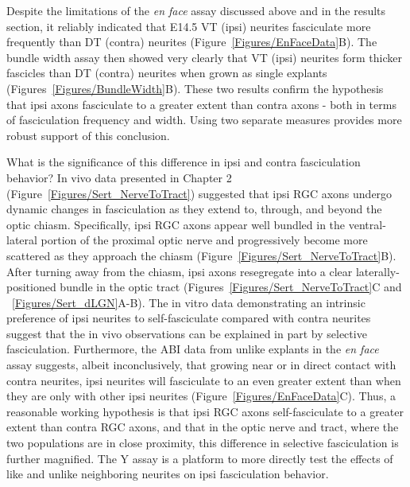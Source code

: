 Despite the limitations of the \emph{en face} assay discussed above and in the results section, it reliably indicated that E14.5 VT (ipsi) neurites fasciculate more frequently than DT (contra) neurites (Figure~\ref{Figures/EnFaceData}B).
The bundle width assay then showed very clearly that VT (ipsi) neurites form thicker fascicles than DT (contra) neurites when grown as single explants (Figures~\ref{Figures/BundleWidth}B).
These two results confirm the hypothesis that ipsi axons fasciculate to a greater extent than contra axons - both in terms of fasciculation frequency and width.
Using two separate measures provides more robust support of this conclusion.

What is the significance of this difference in ipsi and contra fasciculation behavior?
In vivo data presented in Chapter 2 (Figure~\ref{Figures/Sert_NerveToTract}) suggested that ipsi RGC axons undergo dynamic changes in fasciculation as they extend to, through, and beyond the optic chiasm.
Specifically, ipsi RGC axons appear well bundled in the ventral-lateral portion of the proximal optic nerve and progressively become more scattered as they approach the chiasm (Figure~\ref{Figures/Sert_NerveToTract}B).
After turning away from the chiasm, ipsi axons resegregate into a clear laterally-positioned bundle in the optic tract (Figures~\ref{Figures/Sert_NerveToTract}C and ~\ref{Figures/Sert_dLGN}A-B).
The in vitro data demonstrating an intrinsic preference of ipsi neurites to self-fasciculate compared with contra neurites suggest that the in vivo observations can be explained in part by selective fasciculation.
Furthermore, the ABI data from unlike explants in the \emph{en face} assay suggests, albeit inconclusively, that growing near or in direct contact with contra neurites, ipsi neurites will fasciculate to an even greater extent than when they are only with other ipsi neurites (Figure~\ref{Figures/EnFaceData}C).
Thus, a reasonable working hypothesis is that ipsi RGC axons self-fasciculate to a greater extent than contra RGC axons, and that in the optic nerve and tract, where the two populations are in close proximity, this difference in selective fasciculation is further magnified.
The Y assay is a platform to more directly test the effects of like and unlike neighboring neurites on ipsi fasciculation behavior.

